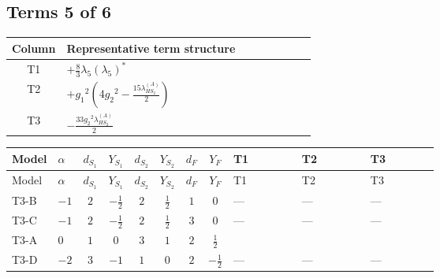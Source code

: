 \documentclass[8pt]{article}
\begin{document}
\begin{landscape}
\subsection*{Terms 5 of 6}
\begin{center}
\begin{tabular}{@{}c >{\raggedright\arraybackslash}p{0.82\linewidth}@{}}
\toprule
Column & Representative term structure \\
\midrule
T1 & \(\displaystyle +\frac{8}{3} {\lambda_5} \left({\lambda_5}\right)^{*}\) \\
\midrule
T2 & \(\displaystyle +{g_1}^2 \left(4 {g_2}^2-\frac{15 {\lambda_{HS_2}^{(A)}}}{2}\right)\) \\
\midrule
T3 & \(\displaystyle -\frac{33 {g_2}^2 {\lambda_{HS_2}^{(A)}}}{2}\) \\
\midrule
\bottomrule
\end{tabular}
\end{center}
\smallskip
\tiny
\begin{longtable}{@{}llcccccc >{\raggedright\arraybackslash}p{0.21\linewidth} >{\raggedright\arraybackslash}p{0.21\linewidth} >{\raggedright\arraybackslash}p{0.21\linewidth}@{}}
\toprule
Model & $\alpha$ & $d_{S_1}$ & $Y_{S_1}$ & $d_{S_2}$ & $Y_{S_2}$ & $d_F$ & $Y_F$ & T1 & T2 & T3 \\
\midrule
\endfirsthead
\toprule
Model & $\alpha$ & $d_{S_1}$ & $Y_{S_1}$ & $d_{S_2}$ & $Y_{S_2}$ & $d_F$ & $Y_F$ & T1 & T2 & T3 \\
\midrule
\endhead
T3-B & $-1$ & $2$ & $-\frac{1}{2}$ & $2$ & $\frac{1}{2}$ & $1$ & $0$ & --- & --- & --- \\
\midrule
T3-C & $-1$ & $2$ & $-\frac{1}{2}$ & $2$ & $\frac{1}{2}$ & $3$ & $0$ & --- & --- & --- \\
\midrule
T3-A & $0$ & $1$ & $0$ & $3$ & $1$ & $2$ & $\frac{1}{2}$ & \scriptsize\adjustbox{max width=\linewidth}{$\begin{gathered} +\frac{8}{3} {\lambda_5} \left({\lambda_5}\right)^{*}\end{gathered}$} & \scriptsize\adjustbox{max width=\linewidth}{$\begin{gathered} +{g_1}^2 \left(4 {g_2}^2-\frac{15 {\lambda_{HS_2}^{(A)}}}{2}\right)\end{gathered}$} & \scriptsize\adjustbox{max width=\linewidth}{$\begin{gathered} -\frac{33 {g_2}^2 {\lambda_{HS_2}^{(A)}}}{2}\end{gathered}$} \\
\midrule
T3-D & $-2$ & $3$ & $-1$ & $1$ & $0$ & $2$ & $-\frac{1}{2}$ & --- & --- & --- \\

\end{longtable}
\end{landscape}
\end{document}
